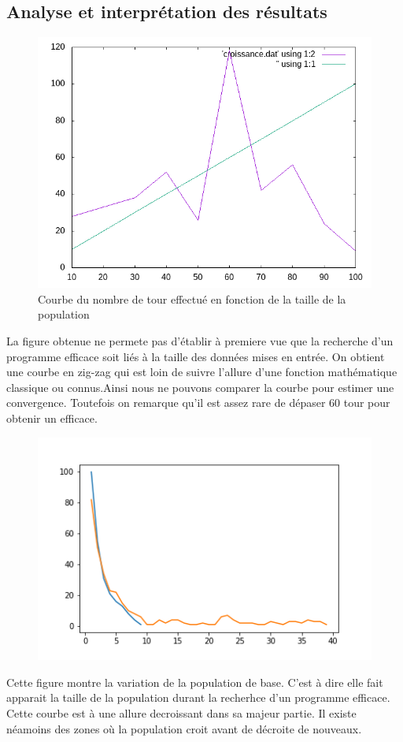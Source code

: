 \documentclass[12pt]{article}
\begin{document}
\subsection*{Analyse et interprétation des résultats}
\begin{figure}[h!]
	\begin{center}
		\includegraphics[scale=0.4]{Images/croissance.png}
	\end{center}
	\caption{Courbe du nombre de tour effectué en fonction de la taille de la population}
\end{figure}
La figure obtenue ne permete pas d'établir à premiere vue que la recherche d'un programme efficace soit liés à la taille des 
données mises en entrée. On obtient une courbe en zig-zag qui est loin de suivre l'allure d'une fonction
mathématique classique ou connus.Ainsi nous ne pouvons comparer la courbe pour estimer une convergence. Toutefois on remarque qu'il est assez rare 
de dépaser 60 tour pour obtenir un efficace.\\
\begin{figure}[h!]
	\begin{center}
		\includegraphics[scale=0.5]{Images/decroissancePopulation.png}
	\end{center}
\end{figure}
Cette figure montre la variation de la population de base. C'est à dire elle fait apparait la taille de la population
durant la recherhce d'un programme efficace. Cette courbe est à une allure decroissant dans sa majeur partie.
Il existe néamoins des zones où la population croit avant de décroite de nouveaux.
\end{document}
